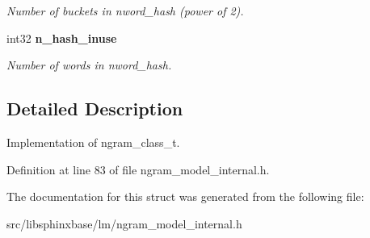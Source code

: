 \begin{CompactItemize}
\begin{CompactList}\small\item\em Number of buckets in nword\_\-hash (power of 2). \item\end{CompactList}\item 
int32 {\bf n\_\-hash\_\-inuse}\label{structngram__class__s_79438cd582363800bc05da31a9ca49d6}

\begin{CompactList}\small\item\em Number of words in nword\_\-hash. \item\end{CompactList}\end{CompactItemize}


\subsection{Detailed Description}
Implementation of ngram\_\-class\_\-t. 

Definition at line 83 of file ngram\_\-model\_\-internal.h.

The documentation for this struct was generated from the following file:\begin{CompactItemize}
\item 
src/libsphinxbase/lm/ngram\_\-model\_\-internal.h\end{CompactItemize}
